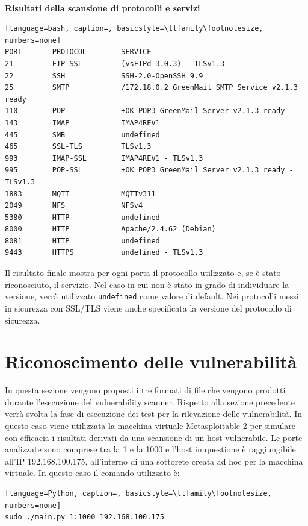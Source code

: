 \documentclass[12pt]{report}
\begin{document}
\noindent
\\
\textbf{Risultati della scansione di protocolli e servizi}
\begin{lstlisting}[language=bash, caption=, basicstyle=\ttfamily\footnotesize, numbers=none]
PORT       PROTOCOL        SERVICE
21         FTP-SSL         (vsFTPd 3.0.3) - TLSv1.3
22         SSH             SSH-2.0-OpenSSH_9.9
25         SMTP            /172.18.0.2 GreenMail SMTP Service v2.1.3 ready
110        POP             +OK POP3 GreenMail Server v2.1.3 ready
143        IMAP            IMAP4REV1
445        SMB             undefined
465        SSL-TLS         TLSv1.3
993        IMAP-SSL        IMAP4REV1 - TLSv1.3
995        POP-SSL         +OK POP3 GreenMail Server v2.1.3 ready - TLSv1.3
1883       MQTT            MQTTv311
2049       NFS             NFSv4
5380       HTTP            undefined
8000       HTTP            Apache/2.4.62 (Debian)
8081       HTTP            undefined
9443       HTTPS           undefined - TLSv1.3
\end{lstlisting}
Il risultato finale mostra per ogni porta il protocollo utilizzato e, se è stato riconosciuto, il servizio. Nel caso in cui non è stato in grado di individuare la versione, verrà utilizzato \lstinline{undefined} come valore di default. Nei protocolli messi in sicurezza con SSL/TLS viene anche specificata la versione del protocollo di sicurezza.

\newpage
\section{Riconoscimento delle vulnerabilità}

In questa sezione vengono proposti i tre formati di file che vengono prodotti durante l'esecuzione del vulnerability scanner. Rispetto alla sezione precedente verrà svolta la fase di esecuzione dei test per la rilevazione delle vulnerabilità. In questo caso viene utilizzata la macchina virtuale Metasploitable 2 per simulare con efficacia i risultati derivati da una scansione di un host vulnerabile. Le porte analizzate sono comprese tra la 1 e la 1000 e l'host in questione è raggiungibile all'IP 192.168.100.175, all'interno di una sottorete creata ad hoc per la macchina virtuale. In questo caso il comando utilizzato è:
\begin{lstlisting}[language=Python, caption=, basicstyle=\ttfamily\footnotesize, numbers=none]
sudo ./main.py 1:1000 192.168.100.175
\end{lstlisting}
\end{document}
